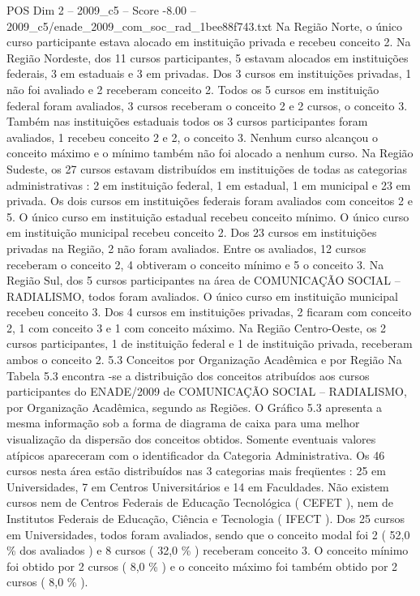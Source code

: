\begin{textsample}{POS Dim 2 – 2009\_c5 – Score -8.00 – 2009\_c5/enade\_2009\_com\_soc\_rad\_1bee88f743.txt}
Na Região Norte, o único curso participante estava alocado em instituição privada e recebeu conceito 2.
Na Região Nordeste, dos 11 cursos participantes, 5 estavam alocados em instituições federais, 3 em estaduais e 3 em privadas.
Dos 3 cursos em instituições privadas, 1 não foi avaliado e 2 receberam conceito 2.
Todos os 5 cursos em instituição federal foram avaliados, 3 cursos receberam o conceito 2 e 2 cursos, o conceito 3.
Também nas instituições estaduais todos os 3 cursos participantes foram avaliados, 1 recebeu conceito 2 e 2, o conceito 3.
Nenhum curso alcançou o conceito máximo e o mínimo também não foi alocado a nenhum curso.
Na Região Sudeste, os 27 cursos estavam distribuídos em instituições de todas as categorias administrativas : 2 em instituição federal, 1 em estadual, 1 em municipal e 23 em privada.
Os dois cursos em instituições federais foram avaliados com conceitos 2 e 5.
O único curso em instituição estadual recebeu conceito mínimo.
O único curso em instituição municipal recebeu conceito 2.
Dos 23 cursos em instituições privadas na Região, 2 não foram avaliados.
Entre os avaliados, 12 cursos receberam o conceito 2, 4 obtiveram o conceito mínimo e 5 o conceito 3.
Na Região Sul, dos 5 cursos participantes na área de COMUNICAÇÃO SOCIAL – RADIALISMO, todos foram avaliados.
O único curso em instituição municipal recebeu conceito 3.
Dos 4 cursos em instituições privadas, 2 ficaram com conceito 2, 1 com conceito 3 e 1 com conceito máximo.
Na Região Centro-Oeste, os 2 cursos participantes, 1 de instituição federal e 1 de instituição privada, receberam ambos o conceito 2. 5.3 Conceitos por Organização Acadêmica e por Região Na Tabela 5.3 encontra -se a distribuição dos conceitos atribuídos aos cursos participantes do ENADE/2009 de COMUNICAÇÃO SOCIAL – RADIALISMO, por Organização Acadêmica, segundo as Regiões.
O Gráfico 5.3 apresenta a mesma informação sob a forma de diagrama de caixa para uma melhor visualização da dispersão dos conceitos obtidos.
Somente eventuais valores atípicos apareceram com o identificador da Categoria Administrativa.
Os 46 cursos nesta área estão distribuídos nas 3 categorias mais freqüentes : 25 em Universidades, 7 em Centros Universitários e 14 em Faculdades.
Não existem cursos nem de Centros Federais de Educação Tecnológica ( CEFET ), nem de Institutos Federais de Educação, Ciência e Tecnologia ( IFECT ).
Dos 25 cursos em Universidades, todos foram avaliados, sendo que o conceito modal foi 2 ( 52,0 \% dos avaliados ) e 8 cursos ( 32,0 \% ) receberam conceito 3.
O conceito mínimo foi obtido por 2 cursos ( 8,0 \% ) e o conceito máximo foi também obtido por 2 cursos ( 8,0 \% ).

\end{textsample}
